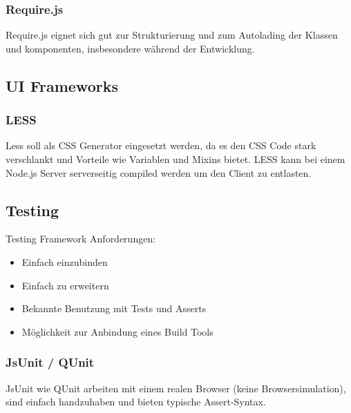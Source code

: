 			\subsubsection{Require.js}
				Require.js eignet sich gut zur Strukturierung und zum Autolading der Klassen und komponenten, 
				insbesondere während der Entwicklung.

		\subsection{UI Frameworks}
			\subsubsection{LESS}
				Less soll als CSS Generator eingesetzt werden, da es den CSS Code stark verschlankt und Vorteile wie Variablen und Mixins bietet. LESS kann bei einem Node.js Server serverseitig compiled werden um den Client zu entlasten.
				
		\subsection{Testing}
			Testing Framework Anforderungen:
			\begin{itemize}
				\item Einfach einzubinden
				\item Einfach zu erweitern
				\item Bekannte Benutzung mit Tests und Asserts
				\item Möglichkeit zur Anbindung eines Build Tools
			\end{itemize}

			\subsubsection{JsUnit / QUnit}
				JsUnit wie QUnit arbeiten mit einem realen Browser (keine Browsersimulation), 
				sind einfach handzuhaben und bieten typische Assert-Syntax.
				
				
